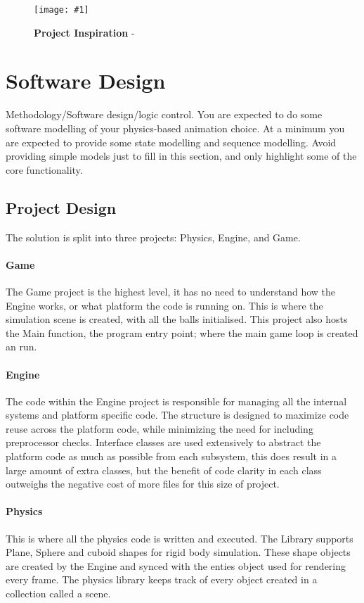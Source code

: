 \documentclass[conference]{acmsiggraph}
\newcommand{\figuremacroW}[4]{
	\begin{figure}[h] %
		\centering
		\texttt{[image: \#1]}
		\caption[#2]{\textbf{#2} - #3}
		\label{fig:#1}
	\end{figure}
}
\begin{document}
\figuremacroW
{balls2}
{Project Inspiration}
{\protect\cite{advert}}
{0.96}

\section{Software Design}
Methodology/Software design/logic control. You are expected to do some software
modelling of your physics-based animation choice. At a minimum you are expected to
provide some state modelling and sequence modelling. Avoid providing simple models just
to fill in this section, and only highlight some of the core functionality.

\subsection{Project Design}
The solution is split into three projects: Physics, Engine, and Game.
\paragraph{Game}
The Game project is the highest level, it has no need to understand how the Engine works, or what platform the code is running on. This is where the simulation scene is created, with all the balls initialised. This project also hosts the Main function, the program entry point; where the main game loop is created an run.

\paragraph{Engine}
The code within the Engine project is responsible for managing all the internal systems and platform specific code. The structure is designed to maximize code reuse across the platform code, while minimizing the need for including preprocessor checks. Interface classes are used extensively to abstract the platform code as much as possible from each subsystem, this does result in a large amount of extra classes, but the benefit of code clarity in each class outweighs the negative cost of more files for this size of project.

\paragraph{Physics}
This is where all the physics code is written and executed. The Library supports Plane, Sphere and cuboid shapes for rigid body simulation. These shape objects are created by the Engine and synced with the enties object used for rendering every frame. The physics library keeps track of every object created in a collection called a scene.
\end{document}
